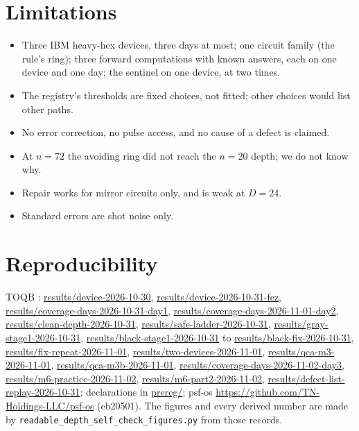 \documentclass[11pt]{article}
\begin{document}
\section{Limitations}
\begin{itemize}
\item Three IBM heavy-hex devices, three days at most; one circuit family (the rule's ring); three forward
  computations with known answers, each on one device and one day; the sentinel on one device, at two times.
\item The registry's thresholds are fixed choices, not fitted; other choices would list other paths.
\item No error correction, no pulse access, and no cause of a defect is claimed.
\item At $n=72$ the avoiding ring did not reach the $n=20$ depth; we do not know why.
\item Repair works for mirror circuits only, and is weak at $D=24$.
\item Standard errors are shot noise only.
\end{itemize}

\section{Reproducibility}
{\sloppy
TOQB \cite{toqb}: \url{results/device-2026-10-30}, \url{results/device-2026-10-31-fez},
\url{results/coverage-days-2026-10-31-day1}, \url{results/coverage-days-2026-11-01-day2},
\url{results/clean-depth-2026-10-31}, \url{results/safe-ladder-2026-10-31}, \url{results/gray-stage1-2026-10-31},
\url{results/black-stage1-2026-10-31} to \url{results/black-fix-2026-10-31}, \url{results/fix-repeat-2026-11-01},
\url{results/two-devices-2026-11-01}, \url{results/qca-m3-2026-11-01}, \url{results/qca-m3b-2026-11-01},
\url{results/coverage-days-2026-11-02-day3}, \url{results/m6-practice-2026-11-02}, \url{results/m6-part2-2026-11-02},
\url{results/defect-list-replay-2026-10-31}; declarations in \url{prereg/}; psf-os \url{https://github.com/TN-Holdings-LLC/psf-os} (eb20501). The figures and every derived number
are made by \texttt{readable\_depth\_self\_check\_figures.py} from those records.\par}
\end{document}
